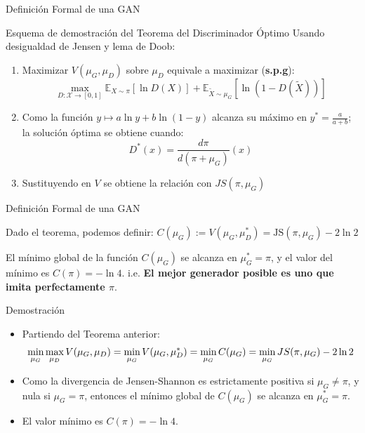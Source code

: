 \documentclass[aspectratio=169,xcolor=dvipsnames, t, spanish]{beamer}
\begin{document}
\begin{frame}{Definición Formal de una GAN}\vspace{-2mm}
\begin{block}{Esquema de demostración del Teorema del Discriminador Óptimo}
Usando desigualdad de Jensen y lema de Doob:
\begin{enumerate}
\item Maximizar $V(\mu_G, \mu_D)$ sobre $\mu_D$ equivale a maximizar (\textbf{s.p.g}): \vspace{-1mm}
\[
\max_{D: \mathcal{X}\to[0,1]} \mathbb{E}_{X\sim \pi}[\ln D(X)] + \mathbb{E}_{\tilde{X}\sim \mu_G}[\ln(1-D(\tilde{X}))]
\]
\item Como la función $y\mapsto a\ln y+b\ln(1-y)$ alcanza su máximo en $y^{*}=\frac{a}{a+b}$; la solución óptima se obtiene cuando: \vspace{-2mm}
        $$D^{*}(x)=\frac{d\pi}{d(\pi+\mu_{G})} (x)$$

\item Sustituyendo en $V$ se obtiene la relación con $JS(\pi, \mu_G)$
\end{enumerate}
\end{block}
\end{frame}


\begin{frame}{Definición Formal de una GAN}\vspace{-7mm}
\begin{center}
    Dado el teorema, podemos definir: $C(\mu_G) := V(\mu_G, \mu_{D}^*) = \text{JS}(\pi, \mu_G) - 2 \ln 2$
\end{center}
\pause
\begin{theorem}
El mínimo global de la función $C(\mu_{G})$ se alcanza en $\mu_{G}^{*}=\pi$, y el valor del mínimo es $C(\pi)=-\ln4$. i.e. \textbf{El mejor generador posible es uno que imita perfectamente $\pi$}.
\end{theorem}
\pause
\begin{block}{Demostración}
    \begin{itemize}
        \item Partiendo del Teorema anterior: \vspace{-2mm}
        $$\min_{\mu_{G}}\max_{\mu_{D}}V(\mu_{G},\mu_{D}) = \min_{\mu_{G}}V(\mu_{G},\mu_{D}^{*}) = \min_{\mu_{G}}C(\mu_{G})= \min_{\mu_{G}}JS(\pi,\mu_{G})-2\ln2 \vspace{-2mm}$$ 
        \item Como la divergencia de Jensen-Shannon es estrictamente positiva si $\mu_{G}\ne\pi$, y nula si $\mu_{G}=\pi$, entonces el mínimo global de $C(\mu_{G})$ se alcanza en $\mu_{G}^{*}=\pi$. 
        \item El valor mínimo es $C(\pi)=-\ln4$. 
    \end{itemize}
\end{block}
\end{frame}
\end{document}
